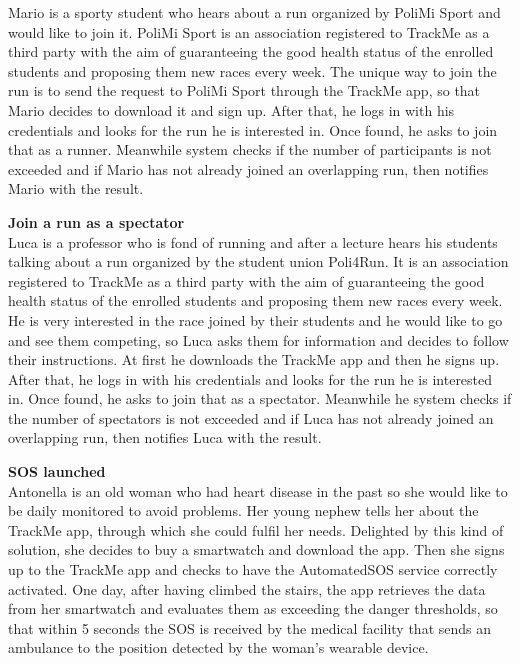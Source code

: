 \documentclass{article}
\begin{document}
\begin{legal}
\begin{legal}
\begin{legal}
{\begin{legal}
Mario is a sporty student who hears about a run organized by PoliMi Sport and would like to join it. PoliMi Sport is an association registered to TrackMe as a third party with the aim of guaranteeing the good health status of the enrolled students and proposing them new races every week. The unique way to join the run is to send the request to PoliMi Sport through the TrackMe app, so that Mario decides to download it and sign up. After that, he logs in with his credentials and looks for the run he is interested in. Once found, he asks to join that as a runner. Meanwhile system checks if the number of participants is not exceeded and if Mario has not already joined an overlapping run, then notifies Mario with the result.\\

		\item \textbf{Join a run as a spectator}\\

Luca is a professor who is fond of running and after a lecture hears his students talking about a run organized by the student union Poli4Run. It is an association registered to TrackMe as a third party with the aim of guaranteeing the good health status of the enrolled students and proposing them new races every week. He is very interested in the race joined by their students and he would like to go and see them competing, so Luca asks them for information and decides to follow their instructions. At first he downloads the TrackMe app and then he signs up. After that, he logs in with his credentials and looks for the run he is interested in. Once found, he asks to join that as a spectator. Meanwhile he system checks if the number of spectators is not exceeded and if Luca has not already joined an overlapping run, then notifies Luca with the result.\\

		\item \textbf{SOS launched}\\

Antonella is an old woman who had heart disease in the past so she would like to be daily monitored to avoid problems. Her young nephew tells her about the TrackMe app, through which she could fulfil her needs. Delighted by this kind of solution, she decides to buy a smartwatch and download the app. Then she signs up to the TrackMe app and checks to have the AutomatedSOS service correctly activated. One day, after having climbed the stairs, the app retrieves the data from her smartwatch and evaluates them as exceeding the danger thresholds, so that within 5 seconds the SOS is received by the medical facility that sends an ambulance to the position detected by the woman’s wearable device.\\



\end{legal}}
\end{legal}
\end{legal}
\end{legal}
\end{document}
